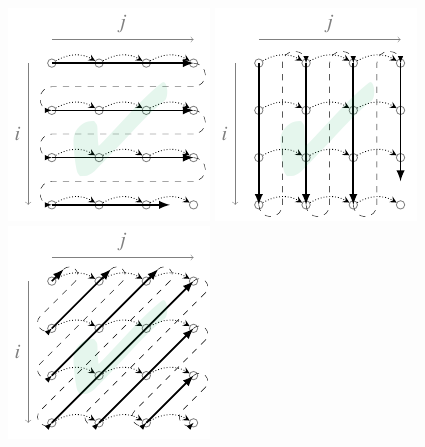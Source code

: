 \documentclass[presentation, aspectratio=169]{beamer}
\begin{document}
\begin{frame}[label={sec:orge1560a3}]{}
\begin{columns}
\begin{column}{0.45\columnwidth}
\begin{figure}
  \centering
  {\includegraphics[width=0.48\linewidth]{figs/schedule-i-j}}
  {\includegraphics[width=0.48\linewidth]{figs/schedule-j-i}}
  {\includegraphics[width=0.48\linewidth]{figs/schedule-ipj-j}}

\end{figure}
\end{column}
\end{columns}
\end{frame}
\end{document}
